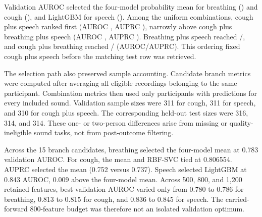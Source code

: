 \documentclass[conference]{IEEEtran}
\begin{document}
Validation AUROC selected the four-model probability mean for breathing
(\BreathValidationAUROC{}) and cough (\CoughValidationAUROC{}), and LightGBM
for speech (\SpeechValidationAUROC{}). Among the uniform combinations,
cough plus speech ranked first (AUROC \FusionValidationAUROC{}, AUPRC
\FusionValidationAUPRC{}), narrowly above cough plus breathing plus speech
(AUROC \AllModalitiesValidationAUROC{}, AUPRC
\AllModalitiesValidationAUPRC{}). Breathing plus speech reached
\BreathSpeechValidationAUROC{}/\BreathSpeechValidationAUPRC{}, and cough plus
breathing reached \CoughBreathValidationAUROC{}/
\CoughBreathValidationAUPRC{} (AUROC/AUPRC). This ordering fixed cough plus
speech before the matching test row was retrieved.

The selection path also preserved sample accounting. Candidate branch metrics
were computed after averaging all eligible recordings belonging to the same
participant. Combination metrics then used only participants with predictions
for every included sound. Validation sample sizes were 311 for cough, 311 for
speech, and 310 for cough plus speech. The corresponding held-out test sizes were
316, 314, and 314. These one- or two-person differences arise from missing or
quality-ineligible sound tasks, not from post-outcome filtering.

Across the 15 branch candidates, breathing selected the four-model mean at
0.783 validation AUROC. For cough, the mean and RBF-SVC tied at 0.806554.
AUPRC selected the mean (0.752 versus 0.737). Speech selected LightGBM at
0.843 AUROC, 0.009 above the four-model mean. Across 500, 800, and 1,200 retained
features, best validation AUROC varied only from 0.780 to 0.786 for breathing,
0.813 to 0.815 for cough, and 0.836 to 0.845 for speech. The carried-forward
800-feature budget was therefore not an isolated validation optimum.
\end{document}
